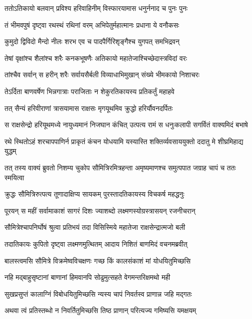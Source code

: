\twolineshloka
{ततोऽतिकायो बलवान् प्रविश्य हरिवाहिनीम्}
{विस्फारयामास धनुर्ननाद च पुनः पुनः} %

\twolineshloka
{तं भीमवपुषं दृष्ट्वा रथस्थं रथिनां वरम्}
{अभिपेतुर्महात्मानः प्रधाना ये वनौकसः} %

\twolineshloka
{कुमुदो द्विविदो मैन्दो नीलः शरभ एव च}
{पादपैर्गिरिशृङ्गैश्च युगपत् समभिद्रवन्} %

\twolineshloka
{तेषां वृक्षांश्च शैलांश्च शरैः कनकभूषणैः}
{अतिकायो महातेजाश्चिच्छेदास्त्रविदां वरः} %

\twolineshloka
{तांश्चैव सर्वान् स हरीन् शरैः सर्वायसैर्बली}
{विव्याधाभिमुखान् संख्ये भीमकायो निशाचरः} %

\twolineshloka
{तेऽर्दिता बाणवर्षेण भिन्नगात्राः पराजिताः}
{न शेकुरतिकायस्य प्रतिकर्तुं महाहवे} %

\twolineshloka
{तत् सैन्यं हरिवीराणां त्रासयामास राक्षसः}
{मृगयूथमिव क्रुद्धो हरिर्यौवनदर्पितः} %

\twolineshloka
{स राक्षसेन्द्रो हरियूथमध्ये नायुध्यमानं निजघान कंचित्}
{उत्पत्य रामं स धनुःकलापी सगर्वितं वाक्यमिदं बभाषे} %

\twolineshloka
{रथे स्थितोऽहं शरचापपाणिर्न प्राकृतं कंचन योधयामि}
{यस्यास्ति शक्तिर्व्यवसाययुक्तो ददातु मे शीघ्रमिहाद्य युद्धम्} %

\twolineshloka
{तत् तस्य वाक्यं ब्रुवतो निशम्य चुकोप सौमित्रिरमित्रहन्ता}
{अमृष्यमाणश्च समुत्पपात जग्राह चापं च ततः स्मयित्वा} %

\twolineshloka
{क्रुद्धः सौमित्रिरुत्पत्य तूणादाक्षिप्य सायकम्}
{पुरस्तादतिकायस्य विचकर्ष महद्धनुः} %

\twolineshloka
{पूरयन् स महीं सर्वामाकाशं सागरं दिशः}
{ज्याशब्दो लक्ष्मणस्योग्रस्त्रासयन् रजनीचरान्} %

\twolineshloka
{सौमित्रेश्चापनिर्घोषं श्रुत्वा प्रतिभयं तदा}
{विसिस्मिये महातेजा राक्षसेन्द्रात्मजो बली} %

\twolineshloka
{तदातिकायः कुपितो दृष्ट्वा लक्ष्मणमुत्थितम्}
{आदाय निशितं बाणमिदं वचनमब्रवीत्} %

\twolineshloka
{बालस्त्वमसि सौमित्रे विक्रमेष्वविचक्षणः}
{गच्छ किं कालसंकाशं मां योधयितुमिच्छसि} %

\twolineshloka
{नहि मद्बाहुसृष्टानां बाणानां हिमवानपि}
{सोढुमुत्सहते वेगमन्तरिक्षमथो मही} %

\twolineshloka
{सुखप्रसुप्तं कालाग्निं विबोधयितुमिच्छसि}
{न्यस्य चापं निवर्तस्व प्राणान्न जहि मद्गतः} %

\twolineshloka
{अथवा त्वं प्रतिस्तब्धो न निवर्तितुमिच्छसि}
{तिष्ठ प्राणान् परित्यज्य गमिष्यसि यमक्षयम्} %

